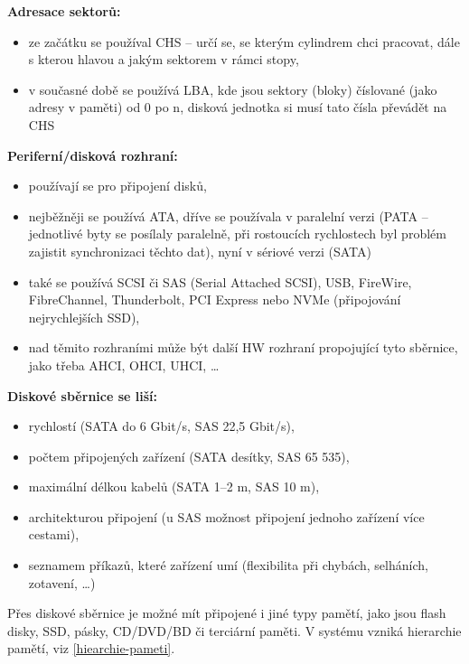 \documentclass[a4paper, 11pt]{article}
\begin{document}
\textbf{Adresace sektorů:}
\begin{itemize}
    \item ze začátku se používal CHS -- určí se, se kterým cylindrem chci pracovat, dále s kterou hlavou a jakým sektorem v rámci stopy,
    \item v současné době se používá LBA, kde jsou sektory (bloky) číslované (jako adresy v paměti) od 0 po n, disková jednotka si musí tato čísla převádět na CHS
\end{itemize}

\textbf{Periferní/disková rozhraní:}
\begin{itemize}
    \item používají se pro připojení disků,
    \item nejběžněji se používá ATA, dříve se používala v paralelní verzi (PATA -- jednotlivé byty se posílaly paralelně, při rostoucích rychlostech byl problém zajistit synchronizaci těchto dat), nyní v sériové verzi (SATA)
    \item také se používá SCSI či SAS (Serial Attached SCSI), USB, FireWire, FibreChannel, Thunderbolt, PCI Express nebo NVMe (připojování nejrychlejších SSD),
    \item nad těmito rozhraními může být další HW rozhraní propojující tyto sběrnice, jako třeba AHCI, OHCI, UHCI, \ldots
\end{itemize}

\textbf{Diskové sběrnice se liší:}
\begin{itemize}
    \item rychlostí (SATA do 6 Gbit/s, SAS 22,5 Gbit/s),
    \item počtem připojených zařízení (SATA desítky, SAS 65 535),
    \item maximální délkou kabelů (SATA 1--2 m, SAS 10 m),
    \item architekturou připojení (u SAS možnost připojení jednoho zařízení více cestami),
    \item seznamem příkazů, které zařízení umí (flexibilita při chybách, selháních, zotavení, \ldots)
\end{itemize}

Přes diskové sběrnice je možné mít připojené i jiné typy pamětí, jako jsou flash disky, SSD, pásky, CD/DVD/BD či terciární paměti. V systému vzniká hierarchie pamětí, viz \ref{hiearchie-pameti}.
\end{document}
